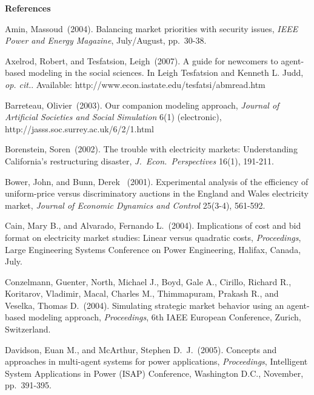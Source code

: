 \documentclass[12pt]{article}
\begin{document}

\bigskip
\bigskip
\noindent \textbf{\Large References}

\smallskip
\begin{description}

\item Amin, Massoud~(2004). Balancing market priorities with security issues,
{\it IEEE Power and Energy Magazine\/}, July/August, pp.~30-38.

\item Axelrod, Robert, and Tesfatsion, Leigh~(2007).  A guide for newcomers to agent-based modeling in the social 
sciences.  In Leigh Tesfatsion and Kenneth L. Judd, \textit{op. cit.\/}.  Available:
http://www.econ.iastate.edu/tesfatsi/abmread.htm 

\item Barreteau, Olivier~(2003). Our companion modeling approach, \textit{Journal of Artificial 
Societies and Social Simulation\/} 6(1) (electronic), http://jasss.soc.surrey.ac.uk/6/2/1.html 

\item Borenstein, Soren~(2002). The trouble with electricity markets: Understanding
California's restructuring disaster, {\it J.\ Econ.\ Perspectives\/}
16(1), 191-211.

\item Bower, John, and Bunn, Derek ~(2001). Experimental analysis of the efficiency of uniform-price versus discriminatory auctions in the England and Wales electricity market, {\it Journal of Economic Dynamics and Control\/} 25(3-4), 561-592.

\item Cain, Mary B., and Alvarado, Fernando L.~(2004).  Implications of cost and bid format on electricity market studies: Linear versus quadratic costs, \textit{Proceedings\/}, Large Engineering Systems Conference on Power Engineering, Halifax, Canada, July.

\item Conzelmann, Guenter, North, Michael J., Boyd, Gale A., Cirillo, Richard R., Koritarov, Vladimir, Macal, Charles M., Thimmapuram, Prakash R., and Veselka, Thomas D.~(2004). Simulating strategic market behavior using an agent-based modeling approach, \textit{Proceedings}, 6th IAEE European Conference, Zurich, Switzerland.

\item Davidson, Euan M., and McArthur, Stephen D.~J.~(2005).  Concepts and approaches in multi-agent 
systems for power applications, \textit{Proceedings\/}, Intelligent System Applications in Power (ISAP) 
Conference, Washington D.C., November, pp.~391-395.


\end{description}
\end{document}
